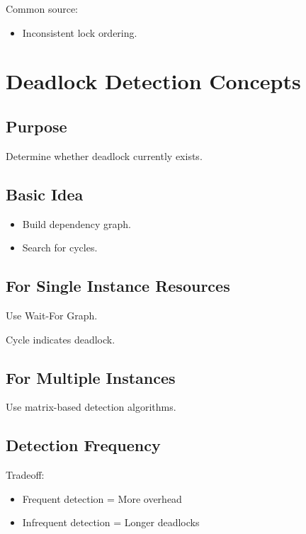 Common source:

\begin{itemize}
\item Inconsistent lock ordering.
\end{itemize}

\section{Deadlock Detection Concepts}

\subsection{Purpose}

Determine whether deadlock currently exists.

\subsection{Basic Idea}

\begin{itemize}
\item Build dependency graph.
\item Search for cycles.
\end{itemize}

\subsection{For Single Instance Resources}

Use Wait-For Graph.

Cycle indicates deadlock.

\subsection{For Multiple Instances}

Use matrix-based detection algorithms.

\subsection{Detection Frequency}

Tradeoff:

\begin{itemize}
\item Frequent detection = More overhead
\item Infrequent detection = Longer deadlocks
\end{itemize}

